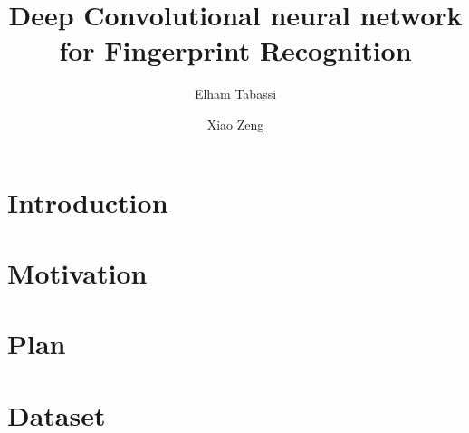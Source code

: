 \documentclass[10pt,twocolumn,letterpaper]{article}
\begin{document}
\title{Deep Convolutional neural network for Fingerprint Recognition}

\author{Elham Tabassi \and Xiao Zeng \\}

\maketitle


%

\section{Introduction}




%

\section{Motivation}


\section{Plan}




\section{Dataset}









{\small


}
\end{document}
